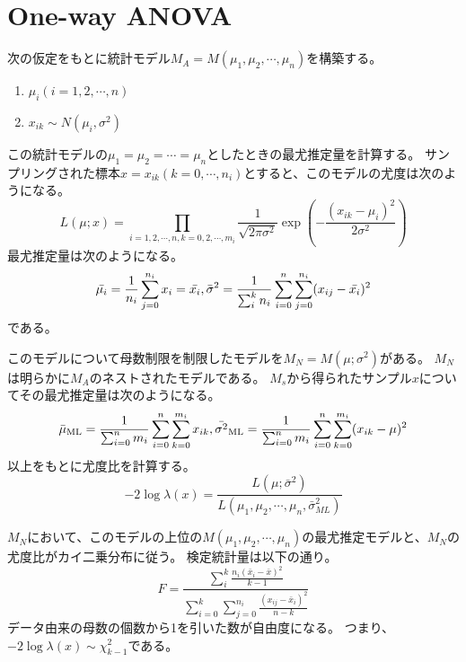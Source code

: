 \section{One-way ANOVA}
次の仮定をもとに統計モデル$M_A=M(\mu_1,\mu_2,\cdots,\mu_n)$を構築する。
\begin{enumerate}
    \item $\mu_i (i=1,2,\cdots,n)$
    \item $x_{ik} \sim N(\mu_i,\sigma^2)$
\end{enumerate}
この統計モデルの$\mu_1=\mu_2=\cdots=\mu_n$としたときの最尤推定量を計算する。
サンプリングされた標本$x = x_{ik} (k=0,\cdots,n_i)$とすると、このモデルの尤度は次のようになる。
\begin{equation*}
    L(\mu;x) = \prod_{i=1,2,\cdots,n,k=0,2,\cdots,m_i}\frac{1}{\sqrt{2\pi\sigma^2}}\exp(-\frac{(x_{ik}-\mu_i)^2}{2\sigma^2})
\end{equation*}
最尤推定量は次のようになる。
\begin{equation*}
    \bar{\mu_i} = \frac{1}{n_i}\sum_{j=0}^{n_i} x_i = \bar{x_i},\\
    \bar{\sigma}^2 = \frac{1}{\sum_{i}^k n_i} \sum_{i=0}^n \sum_{j=0}^{n_i} (x_{ij}-\bar{x_i})^2
\end{equation*}
である。

このモデルについて母数制限を制限したモデルを$M_N=M(\mu;\sigma^2)$がある。
$M_N$は明らかに$M_A$のネストされたモデルである。
$M_s$から得られたサンプル$x$についてその最尤推定量は次のようになる。
\begin{equation*}
    \bar{\mu}_{\rm{ML}} = \frac{1}{\sum_{i=0}^n m_i} \sum_{i=0}^n\sum_{k=0}^{m_i} x_{ik}, \\
    \bar{\sigma^2}_{\rm{ML}} =  \frac{1}{\sum_{i=0}^n m_i} \sum_{i=0}^n \sum_{k=0}^{m_i}(x_{ik} -\mu)^2
\end{equation*}
以上をもとに尤度比を計算する。
\begin{equation*}
    -2\log \lambda(x) = \frac{L(\mu;\bar{\sigma}^2)}{L(\mu_1,\mu_2,\cdots,\mu_n,\bar{\sigma}^2_{ML})}
\end{equation*}

$M_N$において、このモデルの上位の$M(\mu_1,\mu_2,\cdots,\mu_n)$の最尤推定モデルと、$M_N$の尤度比がカイ二乗分布に従う。
検定統計量は以下の通り。
\begin{equation*}
    F = \frac{\sum_i^k \frac{n_i (\bar{x}_i-\bar{x})^2}{k-1}}{ \sum_{i=0}^k\sum_{j=0}^{n_i}\frac{ (x_{ij}-\bar{x}_i)^2 }{n-k}}
\end{equation*}
データ由来の母数の個数から1を引いた数が自由度になる。
つまり、
$-2\log\lambda(x)\sim \chi^2_{k-1}$である。

